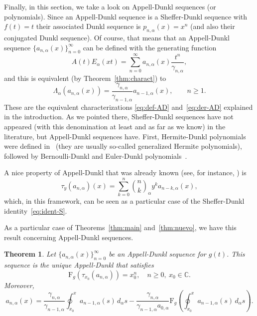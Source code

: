 \documentclass[11pt]{article}
\theoremstyle{plain}
\newtheorem{theorem}{Theorem}[section]
\theoremstyle{remark}
\numberwithin{equation}{section} %
\newcommand{\Ea}{E_{\alpha}}
\newcommand{\binoma}[2]{\binom{#1}{#2}_{\!\alpha}}
\newcommand{\CC}{\mathbb{C}}
\newcommand{\FF}{\mathrm{F}}
\begin{document}
Finally, in this section, we take a look on Appell-Dunkl sequences (or polynomials). Since an Appell-Dunkl sequence is a Sheffer-Dunkl sequence with $f(t) = t$ their associated Dunkl sequence is $p_{n,\alpha}(x) = x^n$ (and also their conjugated Dunkl sequence). Of course, that means that an Appell-Dunkl sequence $\{a_{n,\alpha}(x)\}_{n=0}^\infty$ can be defined with the generating function
\begin{equation}
\label{eq:genfun-A}
    A(t) \Ea(xt) = \sum_{n=0}^\infty a_{n,\alpha}(x) \frac{t^n}{\gamma_{n,\alpha}},
\end{equation}
and this is equivalent (by Theorem~\ref{thm:charact}) to
\begin{equation}
\label{eq:der-A}
\Lambda_\alpha(a_{n,\alpha}(x)) = \frac{\gamma_{n,\alpha}}{\gamma_{n-1,\alpha}}a_{n-1,\alpha}(x),
\qquad n \ge 1.
\end{equation}
These are the equivalent characterizations \eqref{eq:def-AD} and~\eqref{eq:der-AD} explained in the introduction. As we pointed there,
Sheffer-Dunkl sequences have not appeared (with this denomination at least and as far as we know) in the literature, but Appell-Dunkl sequences have. First, Hermite-Dunkl polynomials were defined in~\cite{Ros} (they are usually so-called generalized Hermite polynomials), followed by Bernoulli-Dunkl \cite{CDPV} and Euler-Dunkl polynomials~\cite{DPV}. 

A nice property of Appell-Dunkl that was already known (see, for instance, \cite{Ros}) is
\begin{equation}
\label{eq:A-D-iden}
\tau_y(a_{n,\alpha})(x) = \sum_{k=0}^{n} \binoma{n}{k} y^k a_{n-k,\alpha}(x),
\end{equation}
which, in this framework, can be seen as a particular case of the Sheffer-Dunkl identity~\eqref{eq:ident-S}.

As a particular case of Theorems~\ref{thm:main} and~\ref{thm:nuevo}, we have this result concerning Appell-Dunkl sequences.

\begin{theorem}
\label{thm:Appell-Dunkl}
Let $\{a_{n,\alpha}(x)\}_{n=0}^{\infty}$ be an Appell-Dunkl sequence for $g(t)$. This sequence is the unique Appell-Dunkl  that satisfies
\[
\FF_g(\tau_{x_0}(a_{n,\alpha})) = x_0^n,\quad n\ge 0,\ x_0 \in \CC.
\]
Moreover,
\begin{equation}
\label{eq:recur-Appell}
a_{n,\alpha}(x) = \frac{\gamma_{n,\alpha}}{\gamma_{n-1,\alpha}}
\oint_{x_0}^x a_{n-1,\alpha}(s)\,d_{\alpha}s 
- \frac{\gamma_{n,\alpha}}{\gamma_{n-1,\alpha}a_{0,\alpha}}
\FF_g\left( \oint_{x_0}^x a_{n-1,\alpha}(s)\,d_{\alpha}s\right).
\end{equation}
\end{theorem}
\end{document}
